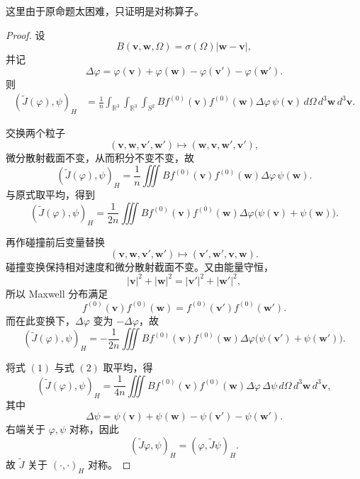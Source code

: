 \begin{itemize}
    \begin{remark}
        这里由于原命题太困难，只证明是对称算子。
    \end{remark}

    \begin{proof}
    设
\[
B(\boldsymbol v,\boldsymbol w,\Omega)
=\sigma(\Omega)|\boldsymbol w-\boldsymbol v|,
\]
并记
\[
\Delta\varphi
=\varphi(\boldsymbol v)+\varphi(\boldsymbol w)
-\varphi(\boldsymbol v')-\varphi(\boldsymbol w').
\]
则
\[
\begin{aligned}
(\widetilde J(\varphi),\psi)_H
&=\frac1n\int_{\mathbb R^3}\int_{\mathbb R^3}
\int_{S^2}
B f^{(0)}(\boldsymbol v)f^{(0)}(\boldsymbol w)
\Delta\varphi\,\psi(\boldsymbol v)
\,d\Omega\,d^3\boldsymbol w\,d^3\boldsymbol v.
\end{aligned}
\]

交换两个粒子
\[
(\boldsymbol v,\boldsymbol w,\boldsymbol v',\boldsymbol w')
\longmapsto
(\boldsymbol w,\boldsymbol v,\boldsymbol w',\boldsymbol v'),
\]
微分散射截面不变，从而积分不变不变，故
\[
(\widetilde J(\varphi),\psi)_H
=\frac1n\iiint
B f^{(0)}(\boldsymbol v)f^{(0)}(\boldsymbol w)
\Delta\varphi\,\psi(\boldsymbol w).
\]
与原式取平均，得到
\[
(\widetilde J(\varphi),\psi)_H
=\frac1{2n}\iiint
B f^{(0)}(\boldsymbol v)f^{(0)}(\boldsymbol w)
\Delta\varphi
\bigl(\psi(\boldsymbol v)+\psi(\boldsymbol w)\bigr).
\tag{1}
\]

再作碰撞前后变量替换
\[
(\boldsymbol v,\boldsymbol w,\boldsymbol v',\boldsymbol w')
\longmapsto
(\boldsymbol v',\boldsymbol w',\boldsymbol v,\boldsymbol w).
\]
碰撞变换保持相对速度和微分散射截面不变。又由能量守恒，
\[
|\boldsymbol v|^2+|\boldsymbol w|^2
=
|\boldsymbol v'|^2+|\boldsymbol w'|^2,
\]
所以 Maxwell 分布满足
\[
f^{(0)}(\boldsymbol v)f^{(0)}(\boldsymbol w)
=
f^{(0)}(\boldsymbol v')f^{(0)}(\boldsymbol w').
\]
而在此变换下，\(\Delta\varphi\) 变为 \(-\Delta\varphi\)，故
\[
(\widetilde J(\varphi),\psi)_H
=-\frac1{2n}\iiint
B f^{(0)}(\boldsymbol v)f^{(0)}(\boldsymbol w)
\Delta\varphi
\bigl(\psi(\boldsymbol v')+\psi(\boldsymbol w')\bigr).
\tag{2}
\]

将式 \((1)\) 与式 \((2)\) 取平均，得
\[
(\widetilde J(\varphi),\psi)_H
=\frac1{4n}\iiint
B f^{(0)}(\boldsymbol v)f^{(0)}(\boldsymbol w)
\Delta\varphi\,\Delta\psi
\,d\Omega\,d^3\boldsymbol w\,d^3\boldsymbol v,
\]
其中
\[
\Delta\psi
=\psi(\boldsymbol v)+\psi(\boldsymbol w)
-\psi(\boldsymbol v')-\psi(\boldsymbol w').
\]
右端关于 \(\varphi,\psi\) 对称，因此
\[
(\widetilde J\varphi,\psi)_H
=(\varphi,\widetilde J\psi)_H.
\]
故 \(\widetilde J\) 关于 \((\cdot,\cdot)_H\) 对称。
    \end{proof}


\end{itemize}
